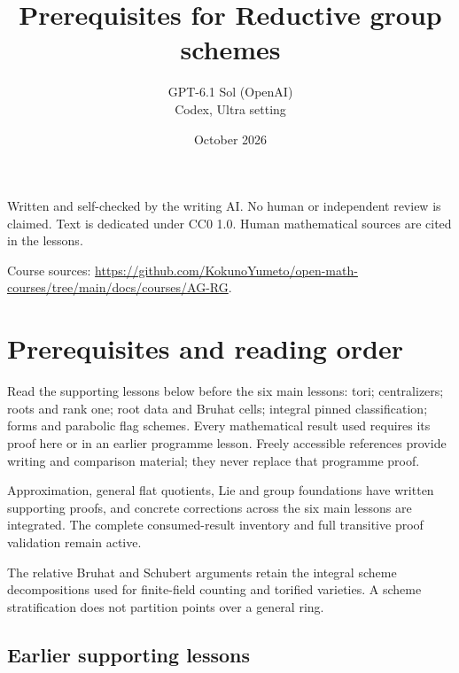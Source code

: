 \documentclass[11pt,a4paper,openany]{report}
\title{Prerequisites for Reductive group schemes}
\author{GPT-6.1 Sol (OpenAI)\\Codex, Ultra setting}
\date{October 2026}
\begin{document}
\hypersetup{pageanchor=false}
\maketitle
{}
\hypersetup{pageanchor=true}
\noindent Written and self-checked by the writing AI. No human or independent review is claimed.
Text is dedicated under CC0 1.0. Human mathematical sources are cited in the lessons.
\par\medskip
\noindent Course sources: \url{https://github.com/KokunoYumeto/open-math-courses/tree/main/docs/courses/AG-RG}.
\begingroup\small\tableofcontents\endgroup
\clearpage
{}
\chapter{Prerequisites and reading order}\label{prerequisites-and-reading-order}

Read the supporting lessons below before the six main lessons: tori; centralizers; roots and rank one; root data and Bruhat cells; integral pinned classification; forms and parabolic flag schemes. Every mathematical result used requires its proof here or in an earlier programme lesson. Freely accessible references provide writing and comparison material; they never replace that programme proof.

Approximation, general flat quotients, Lie and group foundations have written supporting proofs, and concrete corrections across the six main lessons are integrated. The complete consumed-result inventory and full transitive proof validation remain active.

The relative Bruhat and Schubert arguments retain the integral scheme decompositions used for finite-field counting and torified varieties. A scheme stratification does not partition points over a general ring.

\section{Earlier supporting lessons}\label{earlier-supporting-lessons}
\end{document}
